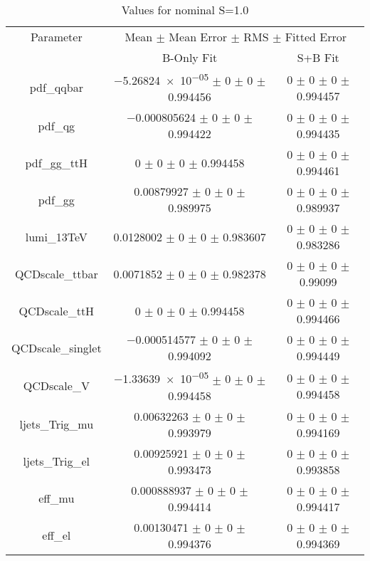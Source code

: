 \begin{table}
\centering
\caption{Values for nominal S=1.0}
\begin{tabular}{ccc}
\toprule
Parameter & \multicolumn{2}{c}{Mean $\pm$ Mean Error $\pm$ RMS $\pm$ Fitted Error}\\
 & B-Only Fit & S+B Fit\\
\midrule
pdf\_qqbar & \num{-5.26824e-05} $\pm$ \num{0} $\pm$ \num{0} $\pm$ \num{0.994456} & \num{0} $\pm$ \num{0} $\pm$ \num{0} $\pm$ \num{0.994457}\\
pdf\_qg & \num{-0.000805624} $\pm$ \num{0} $\pm$ \num{0} $\pm$ \num{0.994422} & \num{0} $\pm$ \num{0} $\pm$ \num{0} $\pm$ \num{0.994435}\\
pdf\_gg\_ttH & \num{0} $\pm$ \num{0} $\pm$ \num{0} $\pm$ \num{0.994458} & \num{0} $\pm$ \num{0} $\pm$ \num{0} $\pm$ \num{0.994461}\\
pdf\_gg & \num{0.00879927} $\pm$ \num{0} $\pm$ \num{0} $\pm$ \num{0.989975} & \num{0} $\pm$ \num{0} $\pm$ \num{0} $\pm$ \num{0.989937}\\
lumi\_13TeV & \num{0.0128002} $\pm$ \num{0} $\pm$ \num{0} $\pm$ \num{0.983607} & \num{0} $\pm$ \num{0} $\pm$ \num{0} $\pm$ \num{0.983286}\\
QCDscale\_ttbar & \num{0.0071852} $\pm$ \num{0} $\pm$ \num{0} $\pm$ \num{0.982378} & \num{0} $\pm$ \num{0} $\pm$ \num{0} $\pm$ \num{0.99099}\\
QCDscale\_ttH & \num{0} $\pm$ \num{0} $\pm$ \num{0} $\pm$ \num{0.994458} & \num{0} $\pm$ \num{0} $\pm$ \num{0} $\pm$ \num{0.994466}\\
QCDscale\_singlet & \num{-0.000514577} $\pm$ \num{0} $\pm$ \num{0} $\pm$ \num{0.994092} & \num{0} $\pm$ \num{0} $\pm$ \num{0} $\pm$ \num{0.994449}\\
QCDscale\_V & \num{-1.33639e-05} $\pm$ \num{0} $\pm$ \num{0} $\pm$ \num{0.994458} & \num{0} $\pm$ \num{0} $\pm$ \num{0} $\pm$ \num{0.994458}\\
ljets\_Trig\_mu & \num{0.00632263} $\pm$ \num{0} $\pm$ \num{0} $\pm$ \num{0.993979} & \num{0} $\pm$ \num{0} $\pm$ \num{0} $\pm$ \num{0.994169}\\
ljets\_Trig\_el & \num{0.00925921} $\pm$ \num{0} $\pm$ \num{0} $\pm$ \num{0.993473} & \num{0} $\pm$ \num{0} $\pm$ \num{0} $\pm$ \num{0.993858}\\
eff\_mu & \num{0.000888937} $\pm$ \num{0} $\pm$ \num{0} $\pm$ \num{0.994414} & \num{0} $\pm$ \num{0} $\pm$ \num{0} $\pm$ \num{0.994417}\\
eff\_el & \num{0.00130471} $\pm$ \num{0} $\pm$ \num{0} $\pm$ \num{0.994376} & \num{0} $\pm$ \num{0} $\pm$ \num{0} $\pm$ \num{0.994369}\\

\end{tabular}
\end{table}
